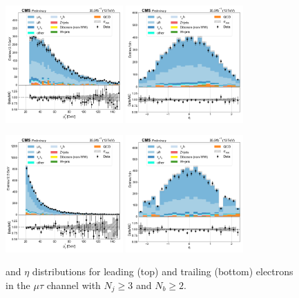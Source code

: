 \begin{figure}[htb!]
    \centering
    \includegraphics[width=0.4\textwidth]{chapters/Analysis/sectionPlots/figures/data_mc_overlays/mutau_2016_cat_gt3_gt2_signal_linear_lepton_lepton1_pt}
    \includegraphics[width=0.4\textwidth]{chapters/Analysis/sectionPlots/figures/data_mc_overlays/mutau_2016_cat_gt3_gt2_signal_linear_lepton_lepton1_eta}

    \includegraphics[width=0.4\textwidth]{chapters/Analysis/sectionPlots/figures/data_mc_overlays/mutau_2016_cat_gt3_gt2_signal_linear_lepton_lepton2_pt}
    \includegraphics[width=0.4\textwidth]{chapters/Analysis/sectionPlots/figures/data_mc_overlays/mutau_2016_cat_gt3_gt2_signal_linear_lepton_lepton2_eta}
    \caption{\pt and $\eta$ distributions for leading (top) and trailing
        (bottom) electrons in the $\mu\tau$ channel with $N_{j} \geq 3$ and
        $N_{b} \geq 2$.}
    \label{fig:analysis:plots:mutau_8_kinematic}
\end{figure}

